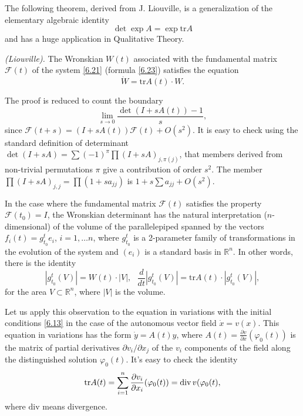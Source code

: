 The following theorem, derived from J. Liouville, is a generalization of the elementary algebraic identity
$$
\det \exp A=\exp \textrm{tr}A
$$
and has a huge application in Qualitative Theory.

\begin{theorem}\label{theo:6.23}
	\emph{(Liouville).}
	The Wronskian $W (t)$ associated with the fundamental matrix $\mathcal{F}(t)$ of the system \eqref{6.21} (formula \eqref{6.23}) satisfies the equation
	$$
	\dot{W}=\textrm{tr}A(t)\cdot W.
	$$
\end{theorem}

The proof is reduced to count the boundary
$$
\lim_{s\rightarrow 0}\frac{\det (I+sA(t))-1}{s},
$$
since $\mathcal{F}(t+s) = (I+sA(t)) \mathcal{F}(t) + O(s^{2})$. It is easy to check using the standard definition of determinant $\det \left(I + sA\right) = \sum \left(-1\right)^{\pi} \prod \left(I + sA\right)_{j, \pi(j)}$, that members derived from non-trivial permutations $\pi$ give a contribution of order $s^2$. The member $\prod \left(I + sA\right)_{j, j} = \prod (1+sa_{jj})$ is $1+s\sum a_{jj} + O(s^{2})$.

In the case where the fundamental matrix $\mathcal{F}(t)$ satisfies the property $\mathcal{F}(t_{0})=I$, the Wronskian determinant has the natural interpretation ($n$-dimensional) of the volume of the parallelepiped spanned by the vectors $f_{i}(t)=g_{t_{0}}^{t}e_{i}$, $i=1,\ldots n$, where $g_{t_{0}}^{t}$ is a 2-parameter family of transformations in the evolution of the system and $\left( e_{i}\right) $ is a standard basis in $\mathbb{R}^{n}$. In other words, there is the identity
\begin{equation}
\label{6.28}
\left\vert g_{t_{0}}^{t}(V)\right\vert =W(t)\cdot \left\vert V\right\vert ,%
\text{ \ \ \ }\frac{d}{dt}\left\vert g_{t_{0}}^{t}(V)\right\vert =\textrm{tr}%
A(t)\cdot \left\vert g_{t_{0}}^{t}(V)\right\vert ,
\end{equation}
for the area $V\subset \mathbb{R}^{n}$, where $\left\vert V\right\vert $ is the volume.

Let us apply this observation to the equation in variations with the initial conditions \eqref{6.13} in the case of the autonomous vector field $\dot{x}=v(x)$. This equation in variations has the form $\dot{y}=A(t)y$, where $A(t)=\frac{\partial v}{\partial x}(\varphi _{0}(t))$ is the matrix of partial derivatives $\partial v_{i}/\partial x_{j}$ of the $v_{i}$ components of the field along the distinguished solution $\varphi _{0}(t)$. It's easy to check the identity
\begin{equation}
\label{6.29}
\textrm{tr}A(t)=\sum_{i=1}^{n}\frac{\partial v_{i}}{\partial x_{i}}(\varphi
_{0}(t))=\textrm{div\,}v(\varphi _{0}(t),
\end{equation}
where $\textrm{div}$ means divergence.

